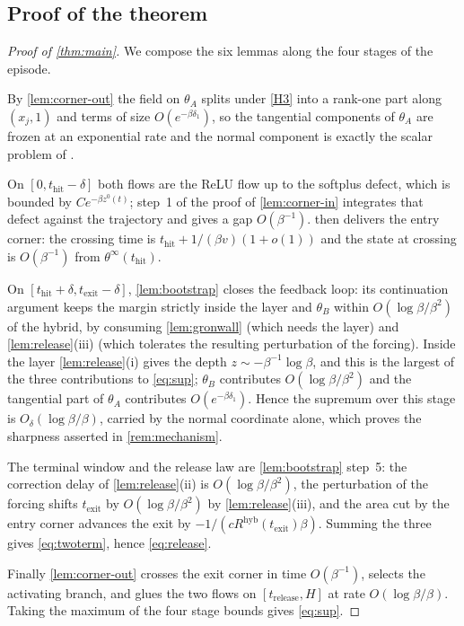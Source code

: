 \documentclass[11pt]{article}
\theoremstyle{definition}
\theoremstyle{remark}
\newcommand{\thit}{t_{\mathrm{hit}}}
\newcommand{\texit}{t_{\mathrm{exit}}}
\newcommand{\trel}{t_{\mathrm{release}}}
\newcommand{\hyb}{\mathrm{hyb}}
\begin{document}
\subsection{Proof of the theorem}\label{sec:proofmain}

\begin{proof}[Proof of \cref{thm:main}]
We compose the six lemmas along the four stages of the episode.

By \cref{lem:corner-out} the field on $\theta_A$ splits under \eqref{H3} into a
rank-one part along $(x_j,1)$ and terms of size $O(e^{-\beta\delta_1})$, so the
tangential components of $\theta_A$ are frozen at an exponential rate and the
normal component is exactly the scalar problem of
.

On $[0,\thit-\delta]$ both flows are the ReLU flow up to the softplus defect,
which is bounded by $C e^{-\beta z^0(t)}$; step~1 of the proof of
\cref{lem:corner-in} integrates that defect against the trajectory and gives a
gap $O(\beta^{-1})$.  then delivers the entry corner: the
crossing time is $\thit+1/(\beta v)(1+o(1))$ and the state at crossing is
$O(\beta^{-1})$ from $\theta^\infty(\thit)$.

On $[\thit+\delta,\texit-\delta]$, \cref{lem:bootstrap} closes the feedback loop:
its continuation argument keeps the margin strictly inside the layer and
$\theta_B$ within $O(\log\beta/\beta^{2})$ of the hybrid, by consuming
\cref{lem:gronwall} (which needs the layer) and \cref{lem:release}(iii) (which
tolerates the resulting perturbation of the forcing). Inside the layer
\cref{lem:release}(i) gives the depth $z\sim-\beta^{-1}\log\beta$, and this is the
largest of the three contributions to \eqref{eq:sup}; $\theta_B$ contributes
$O(\log\beta/\beta^{2})$ and the tangential part of $\theta_A$ contributes
$O(e^{-\beta\delta_1})$. Hence the supremum over this stage is
$O_\delta(\log\beta/\beta)$, carried by the normal coordinate alone, which proves
the sharpness asserted in \cref{rem:mechanism}.

The terminal window and the release law are \cref{lem:bootstrap} step~5: the
correction delay of \cref{lem:release}(ii) is $O(\log\beta/\beta^{2})$, the
perturbation of the forcing shifts $\texit$ by $O(\log\beta/\beta^{2})$ by
\cref{lem:release}(iii), and the area cut by the entry corner advances the exit by
$-1/(cR^{\hyb}(\texit)\beta)$. Summing the three gives \eqref{eq:twoterm}, hence
\eqref{eq:release}.

Finally \cref{lem:corner-out} crosses the exit corner in time $O(\beta^{-1})$,
selects the activating branch, and glues the two flows on $[\trel,H]$ at rate
$O(\log\beta/\beta)$. Taking the maximum of the four stage bounds gives
\eqref{eq:sup}.
\end{proof}
\end{document}
